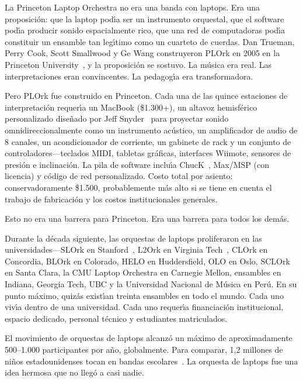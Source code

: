 \documentclass[10pt,letterpaper,twocolumn]{article}
\begin{document}
La Princeton Laptop Orchestra no era una banda con laptops. Era una proposici\'{o}n: que la laptop pod\'{\i}a ser un instrumento orquestal, que el software pod\'{\i}a producir sonido espacialmente rico, que una red de computadoras pod\'{\i}a constituir un ensamble tan leg\'{\i}timo como un cuarteto de cuerdas. Dan Trueman, Perry Cook, Scott Smallwood y Ge Wang construyeron PLOrk en 2005 en la Princeton University~\citep{trueman2006plork, trueman2007why}, y la proposici\'{o}n se sostuvo. La m\'{u}sica era real. Las interpretaciones eran convincentes. La pedagog\'{\i}a era transformadora.

Pero PLOrk fue construido en Princeton. Cada una de las quince estaciones de interpretaci\'{o}n requer\'{\i}a un MacBook (\$1.300+), un altavoz hemisf\'{e}rico personalizado dise\~{n}ado por Jeff Snyder~\citep{snyder2015hemispherical} para proyectar sonido omnidireccionalmente como un instrumento ac\'{u}stico, un amplificador de audio de 8 canales, un acondicionador de corriente, un gabinete de rack y un conjunto de controladores---teclados MIDI, tabletas gr\'{a}ficas, interfaces Wiimote, sensores de presi\'{o}n e inclinaci\'{o}n. La pila de software inclu\'{\i}a ChucK~\citep{wang2003chuck}, Max/MSP (con licencia) y c\'{o}digo de red personalizado. Costo total por asiento: conservadoramente \$1.500, probablemente m\'{a}s alto si se tiene en cuenta el trabajo de fabricaci\'{o}n y los costos institucionales generales.

Esto no era una barrera para Princeton. Era una barrera para todos los dem\'{a}s.

Durante la d\'{e}cada siguiente, las orquestas de laptops proliferaron en las universidades---SLOrk en Stanford~\citep{wang2009designing}, L2Ork en Virginia Tech~\citep{bukvic2010l2ork}, CLOrk en Concordia, BLOrk en Colorado, HELO en Huddersfield, OLO en Oslo, SCLOrk en Santa Clara, la CMU Laptop Orchestra en Carnegie Mellon, ensambles en Indiana, Georgia Tech, UBC y la Universidad Nacional de M\'{u}sica en Per\'{u}. En su punto m\'{a}ximo, quiz\'{a}s exist\'{\i}an treinta ensambles en todo el mundo. Cada uno viv\'{\i}a dentro de una universidad. Cada uno requer\'{\i}a financiaci\'{o}n institucional, espacio dedicado, personal t\'{e}cnico y estudiantes matriculados.

El movimiento de orquestas de laptops alcanz\'{o} un m\'{a}ximo de aproximadamente 500--1.000 participantes por a\~{n}o, globalmente. Para comparar, 1,2 millones de ni\~{n}os estadounidenses tocan en bandas escolares~\citep{warschauer2004technology}. La orquesta de laptops fue una idea hermosa que no lleg\'{o} a casi nadie.
\end{document}

